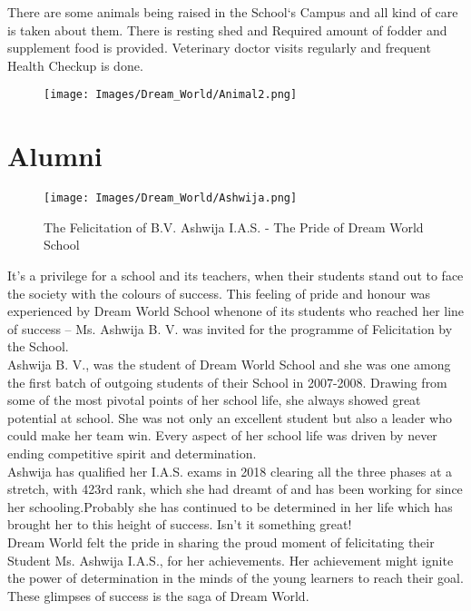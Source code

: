 There are some animals being raised in the School`s Campus and all kind of care is taken about them. There is resting shed and Required amount of fodder and supplement food is provided. Veterinary doctor visits regularly and frequent Health Checkup is done.

\begin{figure}[H]
    \centering
    \texttt{[image: Images/Dream\_World/Animal2.png]}
\end{figure}

\section{Alumni}
\begin{figure}[H]
    \centering
    \texttt{[image: Images/Dream\_World/Ashwija.png]}
    \caption*{The Felicitation of B.V. Ashwija I.A.S. - The Pride of Dream World School}
\end{figure}

It’s a privilege for a school and its teachers, when their students stand out to face the society with the colours of success. This feeling of pride and honour was experienced by Dream World School whenone of its students who reached her line of success – Ms. Ashwija B. V. was invited for the programme of Felicitation by the School. \\

Ashwija B. V., was the student of Dream World School and she was one among the first batch of outgoing students of their School in 2007-2008. Drawing from some of the most pivotal points of her school life, she always showed great potential at school. She was not only an excellent student but also a leader who could make her team win. Every aspect of her school life was driven by never ending competitive spirit and determination. \\

Ashwija has qualified her I.A.S. exams in 2018 clearing all the three phases at a stretch, with 423rd rank, which she had dreamt of and has been working for since her schooling.Probably she has continued to be determined in her life which has brought her to this height of success. Isn’t it something great! \\

Dream World felt the pride in sharing the proud moment of felicitating their Student Ms. Ashwija I.A.S., for her achievements. Her achievement might ignite the power of determination in the minds of the young learners to reach their goal. These glimpses of success is the saga of Dream World. \\

